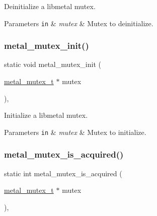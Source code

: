 Deinitialize a libmetal mutex. 


\begin{DoxyParams}[1]{Parameters}
\mbox{\tt in}  & {\em mutex} & Mutex to deinitialize. \\
\hline
\end{DoxyParams}
\mbox{\label{group__mutex_ga0be5610e9c7ee6902dd3d6240ca82271}} 
\subsubsection{\texorpdfstring{metal\+\_\+mutex\+\_\+init()}{metal\_mutex\_init()}}
{\footnotesize\ttfamily static void metal\+\_\+mutex\+\_\+init (\begin{DoxyParamCaption}\item[{\hyperlink{structmetal__mutex__t}{metal\+\_\+mutex\+\_\+t} $\ast$}]{mutex }\end{DoxyParamCaption})\hspace{0.3cm}{\ttfamily [inline]}, {\ttfamily [static]}}



Initialize a libmetal mutex. 


\begin{DoxyParams}[1]{Parameters}
\mbox{\tt in}  & {\em mutex} & Mutex to initialize. \\
\hline
\end{DoxyParams}
\mbox{\label{group__mutex_ga377c63b040af060bdbe26fdaa98231df}} 
\subsubsection{\texorpdfstring{metal\+\_\+mutex\+\_\+is\+\_\+acquired()}{metal\_mutex\_is\_acquired()}}
{\footnotesize\ttfamily static int metal\+\_\+mutex\+\_\+is\+\_\+acquired (\begin{DoxyParamCaption}\item[{\hyperlink{structmetal__mutex__t}{metal\+\_\+mutex\+\_\+t} $\ast$}]{mutex }\end{DoxyParamCaption})\hspace{0.3cm}{\ttfamily [inline]}, {\ttfamily [static]}}



